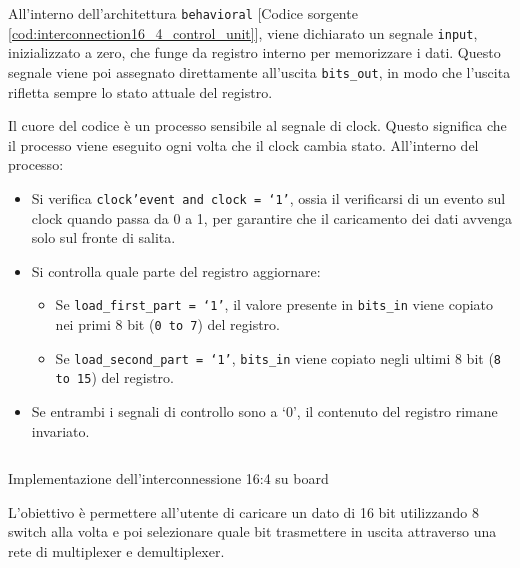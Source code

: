 All’interno dell’architettura \texttt{behavioral} [Codice sorgente \ref{cod:interconnection16_4_control_unit}], viene dichiarato un segnale \texttt{input}, inizializzato a zero, che funge da registro interno per memorizzare i dati. Questo segnale viene poi assegnato direttamente all'uscita \texttt{bits\_out}, in modo che l’uscita rifletta sempre lo stato attuale del registro.

Il cuore del codice è un processo sensibile al segnale di clock. Questo significa che il processo viene eseguito ogni volta che il clock cambia stato.
All’interno del processo:

\begin{itemize}
    \item Si verifica \texttt{clock'event and clock = `1'}, ossia il verificarsi di un evento sul clock quando passa da 0 a 1, per garantire che il caricamento dei dati avvenga solo sul fronte di salita.
    \item Si controlla quale parte del registro aggiornare:
          \begin{itemize}
              \item Se \texttt{load\_first\_part = `1'}, il valore presente in \texttt{bits\_in} viene copiato nei primi 8 bit (\texttt{0 to 7}) del registro.
              \item Se \texttt{load\_second\_part = `1'}, \texttt{bits\_in} viene copiato negli ultimi 8 bit (\texttt{8 to 15}) del registro.
          \end{itemize}
    \item Se entrambi i segnali di controllo sono a `0', il contenuto del registro rimane invariato.
\end{itemize}

\begin{code}
    \inputminted{vhdl}{vhdl/interconnection16_4_onboard.vhd}
    \caption{Implementazione dell'interconnessione 16:4 su board}
    \label{cod:interconnection16_4_onboard}
\end{code}

L’obiettivo è permettere all’utente di caricare un dato di 16 bit utilizzando 8 switch alla volta e poi selezionare quale bit trasmettere in uscita attraverso una rete di multiplexer e demultiplexer.

